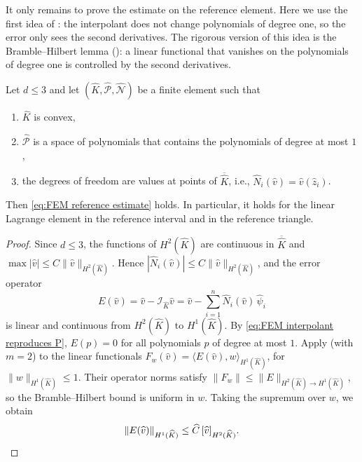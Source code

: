 It only remains to prove the estimate on the reference element.
Here we use the first idea of : the interpolant does not change polynomials of degree one, so the error only sees the second derivatives.
The rigorous version of this idea is the Bramble--Hilbert lemma (): a linear functional that vanishes on the polynomials of degree one is controlled by the second derivatives.
\begin{lemma}
    \label{lem:FEM reference estimate}
    Let $d \le 3$ and let $(\widehat K, \widehat{\mathcal P}, \widehat{\mathcal N})$ be a finite element such that
    \begin{enumerate}
        \item $\widehat K$ is convex,
        \item $\widehat{\mathcal P}$ is a space of polynomials that contains the polynomials of degree at most $1$,
        \item the degrees of freedom are values at points of $\overline{\widehat K}$, i.e., $\widehat N_i (\widehat v) = \widehat v (\widehat z_i)$.
    \end{enumerate}
    Then \eqref{eq:FEM reference estimate} holds. In particular, it holds for the linear Lagrange element in the reference interval and in the reference triangle.
\end{lemma}
\begin{proof}
    Since $d \le 3$, the functions of $H^2(\widehat K)$ are continuous in $\overline{\widehat K}$ and $\max |\widehat v| \le C \| \widehat v \|_{H^2(\widehat K)}$.
    Hence $|\widehat N_i (\widehat v)| \le C \| \widehat v \|_{H^2(\widehat K)}$, and the error operator
    \begin{equation*}
        E (\widehat v) = \widehat v - \mathcal I_{\widehat K} \widehat v = \widehat v - \sum_{i=1}^n \widehat N_i (\widehat v)\, \widehat \psi_i
    \end{equation*}
    is linear and continuous from $H^2(\widehat K)$ to $H^1(\widehat K)$.
    By \eqref{eq:FEM interpolant reproduces P}, $E(p) = 0$ for all polynomials $p$ of degree at most $1$.
    Apply  (with $m = 2$) to the linear functionals $F_w (\widehat v) = \langle E(\widehat v), w \rangle_{H^1(\widehat K)}$, for $\| w \|_{H^1(\widehat K)} \le 1$. Their operator norms satisfy $\|F_w\| \le \|E\|_{H^2(\widehat K)\to H^1(\widehat K)}$, so the Bramble--Hilbert bound is uniform in $w$. Taking the supremum over $w$, we obtain
    \begin{equation*}
        \| E (\widehat v) \|_{H^1(\widehat K)} \le \widehat C\, [ \widehat v ]_{H^2(\widehat K)}. \qedhere
    \end{equation*}
\end{proof}

